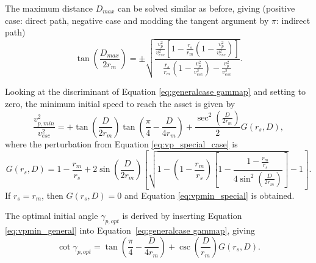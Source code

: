 \documentclass{article}
\begin{document}
The maximum distance $D_{max}$ can be solved similar as before, giving (positive case: direct path, negative case and modding the tangent argument by $\pi$: indirect path)
\begin{equation}
\tan\left(\frac{D_{max}}{2r_m}\right) = \pm\sqrt{\frac{\frac{v_p^2}{v_{esc}^2}\left[1-\frac{r_s}{r_m}\left(1-\frac{v_p^2}{v_{esc}^2}\right)\right]}{\frac{r_s}{r_m}\left(1-\frac{v_p^2}{v_{esc}^2}\right)-\frac{v_p^2}{v_{esc}^2}}}.
\end{equation}

Looking at the discriminant of Equation \eqref{eq:generalcase gammap} and setting to zero, the minimum initial speed to reach the asset is given by
\begin{equation}\label{eq:vpmin_general}
\frac{v_{p,min}^2}{v_{esc}^2} = +\tan\left(\frac{D}{2r_m}\right)\tan\left(\frac{\pi}{4}- \frac{D}{4r_m}\right) + \frac{\sec^2\left(\frac{D}{2r_m}\right)}{2} G(r_s, D),
\end{equation}
where the perturbation from Equation \eqref{eq:vp_special_case} is
\begin{equation}
G(r_s, D) = 1-\frac{r_m}{r_s} + 2\sin\left(\frac{D}{2r_m}\right)\left[\sqrt{1 - \left(1-\frac{r_m}{r_s}\right)\left[1 - \frac{1-\frac{r_m}{r_s}}{4\sin^2\left(\frac{D}{2r_m}\right)}\right]} - 1\right].
\end{equation}
If $r_s=r_m$, then $G(r_s,D) = 0$ and Equation \eqref{eq:vpmin_special} is obtained.

The optimal initial angle $\gamma_{p,opt}$ is derived by inserting Equation \eqref{eq:vpmin_general} into Equation~\eqref{eq:generalcase gammap}, giving
\begin{equation}
\cot\gamma_{p,opt} = \tan\left(\frac{\pi}{4}-\frac{D}{4r_m}\right) + \csc\left(\frac{D}{r_m}\right)G(r_s,D).
\end{equation}
\end{document}
